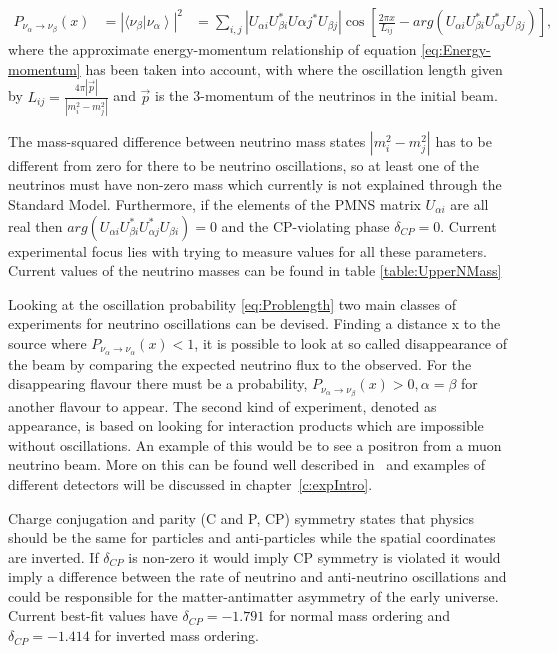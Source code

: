 \begin{equation}
\label{eq:Problength}
\begin{aligned}
P_{\nu_\alpha \rightarrow \nu_\beta} (x) &= \left|  \langle \nu_\beta \left| \nu_\alpha     \right\rangle  \right|^2
& = \sum_{i,j} \left| U_{\alpha i} U_{\beta i}^* U{\alpha j}^* U_{\beta j} \right| \cos[\frac{2\pi x}{L_{ij}} -arg(U_{\alpha i} U_{\beta i}^* U_{\alpha j}^* U_{\beta j} ) ],
\end{aligned}
\end{equation}
where the approximate energy-momentum relationship of equation \ref{eq:Energy-momentum} has been taken into account, with where the oscillation length given by $L_{ij} = \frac{4\pi  \left| \vec{p} \right| }{\left| m_i^2 - m_j^2 \right|}$ and $\vec{p}$ is the 3-momentum of the neutrinos in the initial beam.

The mass-squared difference between neutrino mass states $\left|m_i^2 - m_j^2\right|$ has to be different from zero for there to be neutrino oscillations, so at least one of the neutrinos must have non-zero mass which currently is not explained through the Standard Model. Furthermore, if the elements of the PMNS matrix $U_{\alpha i}$ are all real then $arg(U_{\alpha i} U^*_{\beta i} U^*_{\alpha j}  U_{\beta i} ) = 0$ and the CP-violating phase $\delta_{CP} =0$. Current experimental focus lies with trying to measure values for all these parameters. Current values of the neutrino masses can be found in table \ref{table:UpperNMass}

Looking at the oscillation probability \eqref{eq:Problength} two main classes of experiments for neutrino oscillations can be devised. Finding a distance x to the source where $P_{\nu_\alpha \rightarrow \nu_\alpha} (x) < 1$, it is possible to look at so called disappearance of the beam by comparing the expected neutrino flux to the observed. For the disappearing flavour there must be a probability, $P_{\nu_\alpha \rightarrow \nu_\beta} (x) > 0, \alpha=\beta$ for another flavour to appear. The second kind of experiment, denoted as appearance, is based on looking for interaction products which are impossible without oscillations.  An example of this would be to see a positron from a muon neutrino beam. More on this can be found well described in~\cite{34doi:10.1142/9789812562203_0002} and examples of different detectors will be discussed in chapter~\ref{c:expIntro}.

Charge conjugation and parity (C and P, CP) symmetry states that physics should be the same for particles and anti-particles while the spatial coordinates are inverted. If $\delta_{CP}$ is non-zero it would imply CP symmetry is violated it would imply a difference between the rate of neutrino and anti-neutrino oscillations and could be responsible for the matter-antimatter asymmetry of the early universe. Current best-fit values have $\delta_{CP} = -1.791$ for normal mass ordering and $\delta_{CP} = -1.414$ for inverted mass ordering\cite{T2KResults}.

